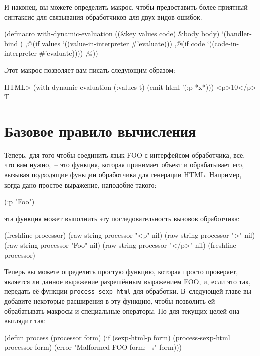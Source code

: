 И наконец, вы можете определить макрос, чтобы предоставить более приятный синтаксис для
связывания обработчиков для двух видов ошибок.

\begin{myverb}
(defmacro with-dynamic-evaluation ((\&{}key values code) \&{}body body)
  `(handler-bind (
       ,@(if values `((value-in-interpreter \#{}'evaluate)))
       ,@(if code `((code-in-interpreter \#'evaluate))))
     ,@))
\end{myverb}

Этот макрос позволяет вам писать следующим образом: 

\begin{myverb}
HTML> (with-dynamic-evaluation (:values t) (emit-html '(:p *x*)))
<p>10</p>
T
\end{myverb}

\normalsize

\section{Базовое правило вычисления}

Теперь, для того чтобы соединить язык FOO с интерфейсом обработчика, все, что вам
нужно,~-- это функция, которая принимает объект и обрабатывает его, вызывая подходящие
функции обработчика для генерации HTML. Например, когда дано простое выражение, наподобие
такого:

\begin{myverb}
(:p "Foo")
\end{myverb}

\noindent{}эта функция может выполнить эту последовательность вызовов обработчика:

\begin{myverb}
(freshline processor)
(raw-string processor "<p" nil)
(raw-string processor ">" nil)
(raw-string processor "Foo" nil)
(raw-string processor "</p>" nil)
(freshline processor)
\end{myverb}

Теперь вы можете определить простую функцию, которая просто проверяет, является ли данное
выражение разрешённым выражением FOO, и, если это так, передать её функции
\lstinline{process-sexp-html} для обработки. В~следующей главе вы добавите некоторые расширения
в эту функцию, чтобы позволить ей обрабатывать макросы и специальные операторы. Но для
текущих целей она выглядит так:

\begin{myverb}
(defun process (processor form)
  (if (sexp-html-p form)
    (process-sexp-html processor form)
    (error "Malformed FOO form: ~s" form)))
\end{myverb}

